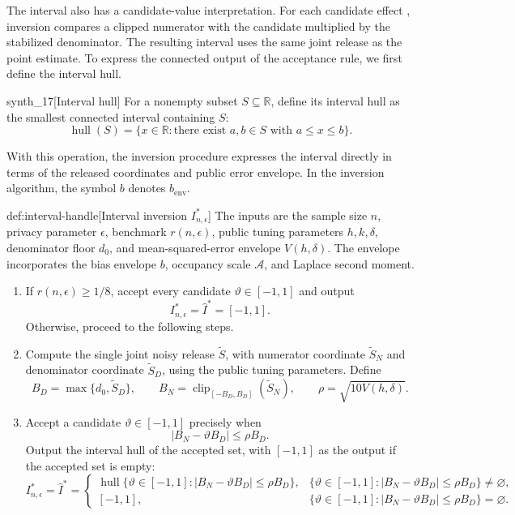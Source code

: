 The interval also has a candidate-value interpretation. For each candidate effect , inversion compares a clipped numerator with the candidate multiplied by the stabilized denominator. The resulting interval  uses the same joint release as the point estimate. To express the connected output of the acceptance rule, we first define the interval hull.
\begin{definitionv}{synth_17}[Interval hull]
For a nonempty subset \(S\subseteq\mathbb R\), define its interval hull as the smallest connected interval containing \(S\):
\[
\operatorname{hull}(S)
=
\{x\in\mathbb R:\text{there exist }a,b\in S\text{ with }a\le x\le b\}.
\]
\end{definitionv}

With this operation, the inversion procedure expresses the interval directly in terms of the released coordinates and public error envelope. In the inversion algorithm, the symbol \(b\) denotes \(b_{\mathrm{env}}\).
\begin{algorithmv}{def:interval-handle}[Interval inversion $I^*_{n,\epsilon}$]
The inputs are the sample size \(n\), privacy parameter \(\epsilon\), benchmark \(r(n,\epsilon)\), public tuning parameters \(h,k,\delta\), denominator floor \(d_0\), and mean-squared-error envelope \(V(h,\delta)\). The envelope incorporates the bias envelope \(b\), occupancy scale \(\mathcal A\), and Laplace second moment.
\begin{enumerate}
\item If \(r(n,\epsilon)\ge 1/8\), accept every candidate \(\vartheta\in[-1,1]\) and output
\[
I^*_{n,\epsilon}=\widehat I^*=[-1,1].
\]
Otherwise, proceed to the following steps.
\item Compute the single joint noisy release \(\widetilde S\), with numerator coordinate \(\widetilde S_N\) and denominator coordinate \(\widetilde S_D\), using the public tuning parameters. Define
\[
B_D=\max\{d_0,\widetilde S_D\},\qquad
B_N=\operatorname{clip}_{[-B_D,B_D]}(\widetilde S_N),\qquad
\rho=\sqrt{10V(h,\delta)}.
\]
\item Accept a candidate \(\vartheta\in[-1,1]\) precisely when
\[
|B_N-\vartheta B_D|\le \rho B_D.
\]
Output the interval hull of the accepted set, with \([-1,1]\) as the output if the accepted set is empty:
\[
I^*_{n,\epsilon}=\widehat I^*=
\begin{cases}
\operatorname{hull}\{\vartheta\in[-1,1]:|B_N-\vartheta B_D|\le\rho B_D\},
& \{\vartheta\in[-1,1]:|B_N-\vartheta B_D|\le\rho B_D\}\ne\varnothing,\\
[-1,1],
& \{\vartheta\in[-1,1]:|B_N-\vartheta B_D|\le\rho B_D\}=\varnothing.
\end{cases}
\]
\end{enumerate}
\end{algorithmv}

